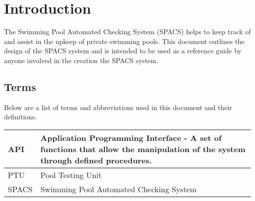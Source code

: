 \section{Introduction}

\par
The Swimming Pool Automated Checking System (SPACS) helps to keep track of and assist in the upkeep of private swimming pools. This document outlines the design of the SPACS system and is intended to be used as a reference guide by anyone involved in the creation the SPACS system.

\subsection{Terms}
\par
Below are a list of terms and abbreviations used in this document and their definitions.

\begin{center}
\begin{tabular}{| l | p{13cm} |}
\hline
API & Application Programming Interface - A set of functions that allow the manipulation of the system through defined procedures. \\ \hline
PTU & Pool Testing Unit \\ \hline
SPACS & Swimming Pool Automated Checking System \\ \hline
\end{tabular}
\end{center}
